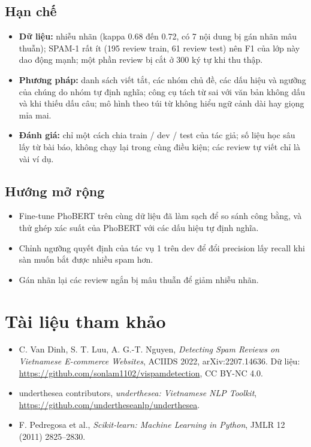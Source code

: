 \subsection{Hạn chế}
\begin{itemize}[leftmargin=1.5cm]
    \item \textbf{Dữ liệu:} nhiễu nhãn (kappa 0.68 đến 0.72, có 7 nội dung bị gán nhãn mâu thuẫn); SPAM-1 rất ít (195 review train, 61 review test) nên F1 của
          lớp này dao động mạnh; một phần review bị cắt ở 300 ký tự khi thu thập.
    \item \textbf{Phương pháp:} danh sách viết tắt, các nhóm chủ đề, các dấu hiệu và ngưỡng của chúng do nhóm tự định nghĩa; công cụ tách từ sai với văn bản không dấu
          và khi thiếu dấu câu; mô hình theo túi từ không hiểu ngữ cảnh dài hay giọng mỉa mai.
    \item \textbf{Đánh giá:} chỉ một cách chia train / dev / test của tác giả; số liệu học sâu lấy từ bài báo, không chạy lại trong cùng điều kiện;
          các review tự viết chỉ là vài ví dụ.
\end{itemize}

\subsection{Hướng mở rộng}
\begin{itemize}[leftmargin=1.5cm]
    \item Fine-tune PhoBERT trên cùng dữ liệu đã làm sạch để so sánh công bằng, và thử ghép xác suất của PhoBERT với các dấu hiệu tự định nghĩa.
    \item Chỉnh ngưỡng quyết định của tác vụ 1 trên dev để đổi precision lấy recall khi sàn muốn bắt được nhiều spam hơn.
    \item Gán nhãn lại các review ngắn bị mâu thuẫn để giảm nhiễu nhãn.
\end{itemize}

\section{Tài liệu tham khảo}
\begin{itemize}[leftmargin=1.5cm]
    \item C. Van Dinh, S. T. Luu, A. G.-T. Nguyen, \textit{Detecting Spam Reviews on Vietnamese E-commerce Websites},
          ACIIDS 2022, arXiv:2207.14636. Dữ liệu: \url{https://github.com/sonlam1102/vispamdetection}, CC BY-NC 4.0.
    \item underthesea contributors, \textit{underthesea: Vietnamese NLP Toolkit}, \url{https://github.com/undertheseanlp/underthesea}.
    \item F. Pedregosa et al., \textit{Scikit-learn: Machine Learning in Python}, JMLR 12 (2011) 2825--2830.
\end{itemize}

\fussy
